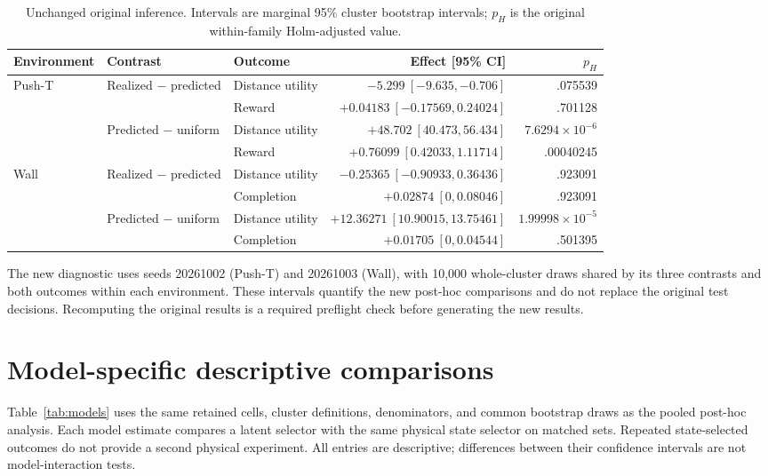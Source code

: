 \documentclass{article}
\begin{document}
\begin{table}[h]
\caption{Unchanged original inference. Intervals are marginal 95\% cluster
bootstrap intervals; $p_H$ is the original within-family Holm-adjusted value.}
\label{tab:original}
\centering\small
\begingroup
\setlength{\tabcolsep}{3pt}
\begin{tabular}{lllrr}
\toprule
Environment & Contrast & Outcome & Effect [95\% CI] & $p_H$\\
\midrule
Push-T & Realized $-$ predicted & Distance utility & $-5.299\ [-9.635,-0.706]$ & .075539\\
 & & Reward & $+0.04183\ [-0.17569,0.24024]$ & .701128\\
 & Predicted $-$ uniform & Distance utility & $+48.702\ [40.473,56.434]$ & $7.6294\!\times\!10^{-6}$\\
 & & Reward & $+0.76099\ [0.42033,1.11714]$ & .00040245\\
Wall & Realized $-$ predicted & Distance utility & $-0.25365\ [-0.90933,0.36436]$ & .923091\\
 & & Completion & $+0.02874\ [0,0.08046]$ & .923091\\
 & Predicted $-$ uniform & Distance utility & $+12.36271\ [10.90015,13.75461]$ & $1.99998\!\times\!10^{-5}$\\
 & & Completion & $+0.01705\ [0,0.04544]$ & .501395\\
\bottomrule
\end{tabular}
\endgroup
\end{table}

The new diagnostic uses seeds 20261002 (Push-T) and 20261003 (Wall), with
10,000 whole-cluster draws shared by its three contrasts and both outcomes
within each environment. These intervals quantify the new post-hoc comparisons
and do not replace the original test decisions. Recomputing the original
results is a required preflight check before generating the new results.

\section{Model-specific descriptive comparisons}
\label{app:models}

Table~\ref{tab:models} uses the same retained cells, cluster definitions,
denominators, and common bootstrap draws as the pooled post-hoc analysis.
Each model estimate compares a latent selector with the same physical state
selector on matched sets. Repeated state-selected outcomes do not provide a
second physical experiment. All entries are descriptive; differences between
their confidence intervals are not model-interaction tests.
\end{document}

